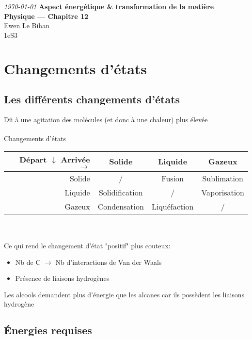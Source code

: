 \documentclass{article}
\begin{document}
\begin{titlepage}
\begin{center}
\textit{\today}
\vfill
\textbf{\LARGE{Aspect énergétique \& transformation de la matière}\\\Large{Physique --- Chapitre 12}}\\
\vfill
\large{Ewen Le Bihan\\1eS3}
\end{center}
\end{titlepage}

\section{Changements d'états}
\subsection{Les différents changements d'états}
Dû à une agitation des molécules (et donc à une chaleur) plus élevée\\\\
Changements d'états\\
\begin{tabular}{r||c|c|c}
	Départ $\downarrow$ Arrivée $\rightarrow$  &  Solide & Liquide & Gazeux\\
	\hline \hline
	Solide & / & Fusion & Sublimation\\
	\hline
	Liquide & Solidification & / & Vaporisation\\
	\hline
	Gazeux & Condensation & Liquéfaction & /
\end{tabular}
\\\\
Ce qui rend le changement d'état "positif" plus couteux:
\begin{itemize}
	\item Nb de C $\to$ Nb d'interactions de Van der Waals
	\item Présence de liaisons hydrogènes
\end{itemize}
Les alcools demandent plus d'énergie que les alcanes car ils possèdent les liaisons hydrogène
\subsection{Énergies requises}

\end{document}
